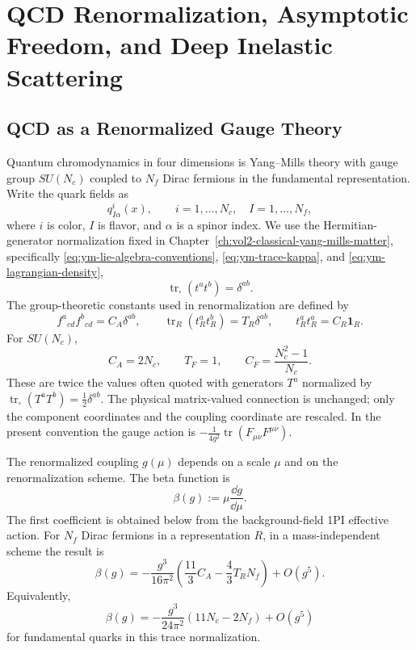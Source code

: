 \chapter{QCD Renormalization, Asymptotic Freedom, and Deep Inelastic Scattering}
\label{ch:volume-ii-19}
\ConventionsLorentzian


\section{QCD as a Renormalized Gauge Theory}

Quantum chromodynamics in four dimensions is Yang--Mills theory with gauge
group \(SU(N_c)\) coupled to \(N_f\) Dirac fermions in the fundamental
representation.  Write the quark fields as
\[
  q^i_{I\alpha}(x),
  \qquad
  i=1,\ldots,N_c,\quad I=1,\ldots,N_f,
\]
where \(i\) is color, \(I\) is flavor, and \(\alpha\) is a spinor index.  We
use the Hermitian-generator normalization fixed in
Chapter~\ref{ch:vol2-classical-yang-mills-matter}, specifically
\eqref{eq:ym-lie-algebra-conventions}, \eqref{eq:ym-trace-kappa}, and
\eqref{eq:ym-lagrangian-density},
\[
  \operatorname{tr}_{\square}(t^a t^b)=\delta^{ab}.
\]
The group-theoretic constants used in renormalization are defined by
\begin{equation}
  f^a{}_{cd}f^b{}_{cd}=C_A\delta^{ab},
  \qquad
  \operatorname{tr}_{R}(t_R^a t_R^b)=T_R\delta^{ab},
  \qquad
  t_R^a t_R^a=C_R\mathbf 1_R .
  \label{eq:qcd-casimir-definitions}
\end{equation}
For \(SU(N_c)\),
\[
  C_A=2N_c,\qquad
  T_F=1,\qquad
  C_F=\frac{N_c^2-1}{N_c}.
\]
These are twice the values often quoted with generators \(T^a\) normalized by
\(\operatorname{tr}_{\square}(T^aT^b)=\frac12\delta^{ab}\).  The physical
matrix-valued connection is unchanged; only the component coordinates and the
coupling coordinate are rescaled.  In the present convention the gauge action is
\(-\frac1{4g^2}\operatorname{tr}(F_{\mu\nu}F^{\mu\nu})\).

The renormalized coupling \(g(\mu)\) depends on a scale \(\mu\) and on the
renormalization scheme.  The beta function is
\[
  \beta(g):=\mu\frac{\dd g}{\dd\mu}.
\]
The first coefficient is obtained below from the background-field 1PI
effective action.  For \(N_f\) Dirac fermions in a representation \(R\), in a
mass-independent scheme the result is
\begin{equation}
  \beta(g)
  =
  -\frac{g^3}{16\pi^2}
  \left(
  \frac{11}{3}C_A-\frac{4}{3}T_R N_f
  \right)
  +O(g^5).
  \label{eq:qcd-one-loop-beta-general}
\end{equation}
Equivalently,
\begin{equation}
  \beta(g)
  =
  -\frac{g^3}{24\pi^2}
  \left(
  11N_c-2N_f
  \right)
  +O(g^5)
  \label{eq:qcd-one-loop-beta-fundamental}
\end{equation}
for fundamental quarks in this trace normalization.

